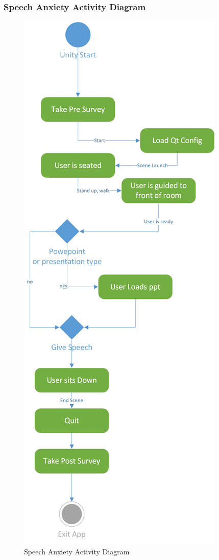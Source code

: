 \documentclass[a4paper,10pt]{article}
\begin{document}
\subsubsection{Speech Anxiety Activity Diagram}
\begin{figure}[H]
					\centerline{\includegraphics[scale = 0.6]{spcActivityDiag.png}}
					\caption{Speech Anxiety  Activity Diagram}
					\label{fig:spcAct}
				\end{figure}
\end{document}
